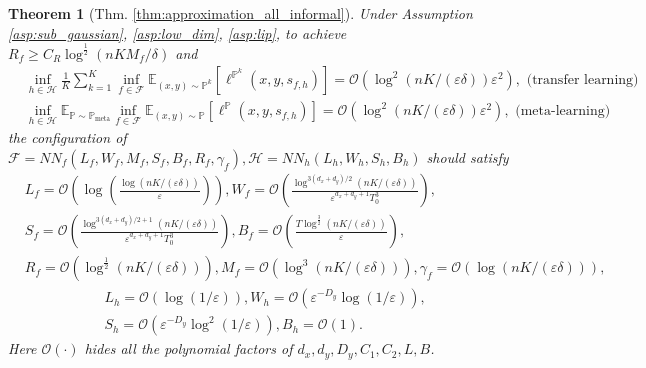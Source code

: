 \documentclass{article}
\numberwithin{equation}{section}
\newcommand{\E}{\mathbb{E}}
\newtheorem{thm}{Theorem}[section]
\theoremstyle{definition}
\newcommand{\Pmeta}{\mathbb{P}_{\text{meta}}}
\renewcommand{\P}{\mathbb{P}}
\begin{document}
\begin{thm}[Thm. \ref{thm:approximation_all_informal}]
\label{thm:approximation_all}
    Under Assumption \ref{asp:sub_gaussian}, \ref{asp:low_dim}, \ref{asp:lip}, to achieve $R_f\geq C_R\log^{\frac{1}{2}}(nKM_f/\delta)$ and
    \begin{align}
        &\inf_{h\in\mathcal{H}} \frac{1}{K}\sum_{k=1}^K \inf_{f\in\mathcal{F}}\E_{(x,y)\sim\P^k} [\ell^{\P^k} (x,y,s_{f,h})] = \mathcal{O}\left(\log^2(nK/(\varepsilon\delta))\varepsilon^2\right), \text{ (transfer learning)} \\
        &\inf_{h\in\mathcal{H}}\E_{\P\sim\Pmeta}\inf_{f\in\mathcal{F}}\E_{(x,y)\sim\P} [\ell^\P(x,y,s_{f,h})] = \mathcal{O}\left(\log^2(nK/(\varepsilon\delta))\varepsilon^2\right), \text{ (meta-learning)}
    \end{align}
    the configuration of $\mathcal{F}=NN_f(L_f,W_f,M_f,S_f,B_f,R_f,\gamma_f),\mathcal{H}=NN_h(L_h,W_h,S_h,B_h)$ should satisfy
    \begin{equation}
        \begin{aligned}
            &L_f=\mathcal{O}\left(\log\left(\frac{\log(nK/(\varepsilon\delta))}{\varepsilon}\right)\right),
            W_f=\mathcal{O}\left(\frac{\log^{3(d_x+d_y)/2}(nK/(\varepsilon\delta))}{\varepsilon^{d_x+d_y+1}T_0^3}\right), \\
            &S_f=\mathcal{O}\left(\frac{\log^{3(d_x+d_y)/2+1}(nK/(\varepsilon\delta))}{\varepsilon^{d_x+d_y+1}T_0^3}\right),
            B_f=\mathcal{O}\left(\frac{T\log^{\frac{3}{2}}(nK/(\varepsilon\delta))}{\varepsilon}\right), \\
            &R_f=\mathcal{O}\left(\log^{\frac{1}{2}}(nK/(\varepsilon\delta))\right), 
            M_f=\mathcal{O}\left(\log^3(nK/(\varepsilon\delta))\right),
            \gamma_f=\mathcal{O}\left(\log(nK/(\varepsilon\delta))\right),
        \end{aligned}
    \end{equation}
     \begin{equation}
        \begin{aligned}
            &L_h=\mathcal{O}\left(\log(1/\varepsilon)\right), W_h=\mathcal{O}\left(\varepsilon^{-D_y}\log(1/\varepsilon)\right), \\
            &S_h=\mathcal{O}\left(\varepsilon^{-D_y}\log^2(1/\varepsilon)\right),
            B_h = \mathcal{O}(1).
        \end{aligned}
    \end{equation}
    Here $\mathcal{O}(\cdot)$ hides all the polynomial factors of $d_x,d_y,D_y,C_1,C_2,L,B$.
\end{thm}
\end{document}
